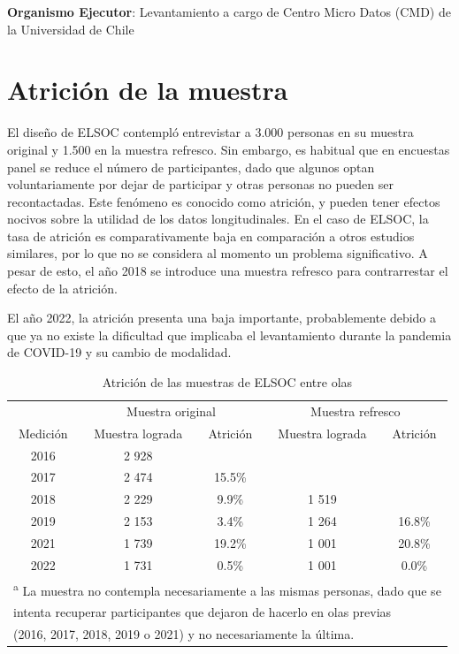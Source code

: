 \documentclass[
  12pt,
]{book}
\begin{document}
\textbf{Organismo Ejecutor}: Levantamiento a cargo de Centro Micro Datos (CMD) de la Universidad de Chile

\hypertarget{atriciuxf3n-de-la-muestra}{%
\section{Atrición de la muestra}\label{atriciuxf3n-de-la-muestra}}

El diseño de ELSOC contempló entrevistar a 3.000 personas en su muestra original y 1.500 en la muestra refresco. Sin embargo, es habitual que en encuestas panel se reduce el número de participantes, dado que algunos optan voluntariamente por dejar de participar y otras personas no pueden ser recontactadas. Este fenómeno es conocido como atrición, y pueden tener efectos nocivos sobre la utilidad de los datos longitudinales. En el caso de ELSOC, la tasa de atrición es comparativamente baja en comparación a otros estudios similares, por lo que no se considera al momento un problema significativo. A pesar de esto, el año 2018 se introduce una muestra refresco para contrarrestar el efecto de la atrición.

El año 2022, la atrición presenta una baja importante, probablemente debido a que ya no existe la dificultad que implicaba el levantamiento durante la pandemia de COVID-19 y su cambio de modalidad.

\begin{table}

\caption{\label{tab:tabla-atricion}Atrición de las muestras de ELSOC entre olas}
\centering
\begin{tabular}[t]{c|c|c|c|c}
\hline
\multicolumn{1}{c|}{ } & \multicolumn{2}{c|}{Muestra original} & \multicolumn{2}{c}{Muestra refresco} \\
\cline{2-3} \cline{4-5}
Medición & Muestra lograda & Atrición & Muestra lograda & Atrición\\
\hline
2016 & 2 928 &  &  & \\
\hline
2017 & 2 474 & 15.5\% &  & \\
\hline
2018 & 2 229 & 9.9\% & 1 519 & \\
\hline
2019 & 2 153 & 3.4\% & 1 264 & 16.8\%\\
\hline
2021 & 1 739 & 19.2\% & 1 001 & 20.8\%\\
\hline
2022 & 1 731 & 0.5\% & 1 001 & 0.0\%\\
\hline
\multicolumn{5}{l}{\textsuperscript{a} La muestra no contempla necesariamente a las mismas personas, dado que se}\\
\multicolumn{5}{l}{intenta recuperar participantes que dejaron de hacerlo en olas previas}\\
\multicolumn{5}{l}{(2016, 2017, 2018, 2019 o 2021) y no necesariamente la última.}\\
\end{tabular}
\end{table}
\end{document}
